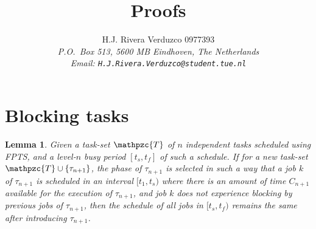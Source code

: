 \documentclass[fleqn]{article}
\title{\sf Proofs}
\author{{\sf H.J. Rivera Verduzco 0977393}\\
{\footnotesize\sl P.O.~Box 513, 5600 MB Eindhoven, The Netherlands}\\
{\footnotesize \sl Email: \tt H.J.Rivera.Verduzco@student.tue.nl}}
\newtheorem{lemma}{Lemma}
\begin{document}
\maketitle


\section{Blocking tasks}


\begin{lemma}
	Given a task-set $\mathpzc{T}$ of $n$ independent tasks scheduled using FPTS, and a level-$n$ busy period $[t_s,t_f]$ of such a schedule. If for a new task-set $\mathpzc{T} \cup \{\tau_{n+1}\}$, the phase of $\tau_{n+1}$ is selected in such a way that a job $k$ of $\tau_{n+1}$ is scheduled in an interval $[t_1,t_s)$ where there is an amount of time $C_{n+1}$ available for the execution of $\tau_{n+1}$, and job $k$ does not experience blocking by previous jobs of $\tau_{n+1}$, then the schedule of all jobs in $[t_s,t_f)$ remains the same after introducing $\tau_{n+1}$.
\end{lemma}
\end{document}
